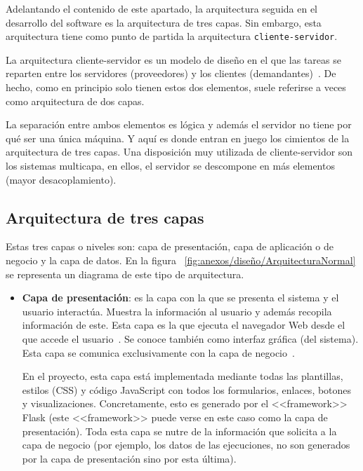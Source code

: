 Adelantando el contenido de este apartado, la arquitectura seguida en el
desarrollo del software es la arquitectura de tres capas. Sin embargo, esta
arquitectura tiene como punto de partida la arquitectura
\texttt{cliente-servidor}.

La arquitectura cliente-servidor es un modelo de diseño en el que las tareas se
reparten entre los servidores (proveedores) y los clientes
(demandantes)~\cite{eswiki:149310099}. De hecho, como en principio solo tienen
estos dos elementos, suele referirse a veces como arquitectura de dos capas.

La separación entre ambos elementos es lógica y además el servidor no tiene por
qué ser una única máquina. Y aquí es donde entran en juego los cimientos de la
arquitectura de tres capas. Una disposición muy utilizada de cliente-servidor
son los sistemas multicapa, en ellos, el servidor se descompone en más elementos
(mayor desacoplamiento).

\subsection{Arquitectura de tres capas}

Estas tres capas o niveles son: capa de presentación, capa de aplicación o de
negocio y la capa de datos. En la figura
~\ref{fig:anexos/diseño/ArquitecturaNormal} se representa un diagrama de este
tipo de arquitectura.



\begin{itemize}
    \item \textbf{Capa de presentación}: es la capa con la que se presenta el
    sistema y el usuario interactúa. Muestra la información al usuario y además
    recopila información de este. Esta capa es la que ejecuta el navegador Web
    desde el que accede el usuario~\cite{arq3capas:ibm}. Se conoce también como
    interfaz gráfica (del sistema). Esta capa se comunica exclusivamente con la
    capa de negocio~\cite{eswiki:149121324}.

    En el proyecto, esta capa está implementada mediante todas las plantillas,
    estilos (CSS) y código JavaScript con todos los formularios, enlaces,
    botones y visualizaciones. Concretamente, esto es generado por el
    <<framework>> Flask (este <<framework>> puede verse en este caso como la
    capa de presentación). Toda esta capa se nutre de la información que
    solicita a la capa de negocio (por ejemplo, los datos de las ejecuciones, no
    son generados por la capa de presentación sino por esta última). 
\end{itemize}

